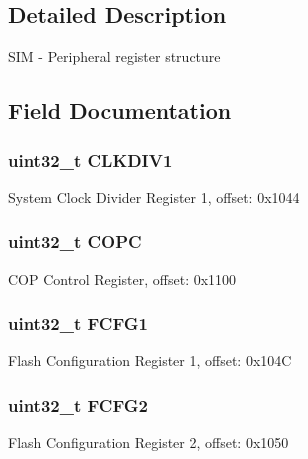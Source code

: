 \subsection{Detailed Description}
S\+I\+M -\/ Peripheral register structure 

\subsection{Field Documentation}
\hypertarget{struct_s_i_m___mem_map_ae56d33007aecc902d1394c2adca212af}{}
\subsubsection[{C\+L\+K\+D\+I\+V1}]{\setlength{\rightskip}{0pt plus 5cm}uint32\+\_\+t C\+L\+K\+D\+I\+V1}\label{struct_s_i_m___mem_map_ae56d33007aecc902d1394c2adca212af}
System Clock Divider Register 1, offset\+: 0x1044 \hypertarget{struct_s_i_m___mem_map_a4af8557704666ca737fef4ed12200093}{}
\subsubsection[{C\+O\+P\+C}]{\setlength{\rightskip}{0pt plus 5cm}uint32\+\_\+t C\+O\+P\+C}\label{struct_s_i_m___mem_map_a4af8557704666ca737fef4ed12200093}
C\+O\+P Control Register, offset\+: 0x1100 \hypertarget{struct_s_i_m___mem_map_ab2a9ce086973740fcd958ea83a6967f2}{}
\subsubsection[{F\+C\+F\+G1}]{\setlength{\rightskip}{0pt plus 5cm}uint32\+\_\+t F\+C\+F\+G1}\label{struct_s_i_m___mem_map_ab2a9ce086973740fcd958ea83a6967f2}
Flash Configuration Register 1, offset\+: 0x104\+C \hypertarget{struct_s_i_m___mem_map_a548bbc722cef80f7bc9624f1309964c1}{}
\subsubsection[{F\+C\+F\+G2}]{\setlength{\rightskip}{0pt plus 5cm}uint32\+\_\+t F\+C\+F\+G2}\label{struct_s_i_m___mem_map_a548bbc722cef80f7bc9624f1309964c1}
Flash Configuration Register 2, offset\+: 0x1050 \hypertarget{struct_s_i_m___mem_map_a10c826c9197f80b94fa050a36943e871}{}
